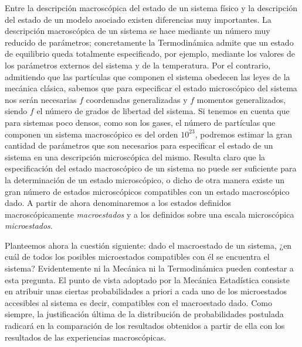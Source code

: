 Entre la descripción macroscópica del estado de un sistema físico y la descripción del estado de un modelo asociado existen diferencias muy importantes. La descripción macroscópica de un sistema se hace mediante un número muy reducido de parámetros; concretamente la Termodinámica admite que un estado de equilibrio queda totalmente especificado, por ejemplo, mediante los valores de los parámetros externos del sistema y de la temperatura.
Por el contrario, admitiendo que las partículas que componen el sistema obedecen las leyes de la mecánica clásica, sabemos que para especificar el estado microscópico del sistema nos serán necesarias $f$ coordenadas generalizadas y
$f$ momentos generalizados, siendo $f$ el número de grados de libertad del sistema.
Si tenemos en cuenta que para sistemas poco densos, como son los gases, el número de partículas que componen un sistema macroscópico es del orden $10^{23}$, podremos estimar la gran cantidad de parámetros que son necesarios para
especificar el estado de un sistema en una descripción microscópica del mismo.
Resulta claro que la especificación del estado macroscópico de un sistema no puede ser suficiente para la determinación de un estado microscópico, o dicho de otra manera existe un gran número de estados microscópicos compatibles con un estado macroscópico dado. A partir de ahora denominaremos a los estados definidos macroscópicamente \emph{macroestados} y a los definidos sobre una escala microscópica \emph{microestados}.

Planteemos ahora la cuestión siguiente: dado el macroestado de un sistema, ¿en cuál de todos los posibles microestados compatibles con él se encuentra el sistema?
Evidentemente ni la Mecánica ni la Termodinámica pueden contestar a esta pregunta.
El punto de vista adoptado por la Mecánica Estadística consiste en atribuir unas ciertas probabilidades a priori a cada uno de los microestados accesibles al sistema es decir, compatibles con el macroestado dado.
Como siempre, la justificación última de la distribución de probabilidades postulada radicará en la comparación de los resultados obtenidos a partir de ella con los resultados de las experiencias macroscópicas.

